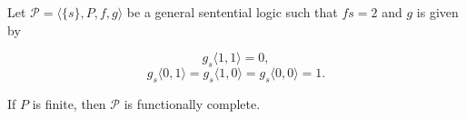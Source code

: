 Let $\mathcal{P} = \langle \{s\}, P, f, g \rangle$ be a general sentential logic such that $fs = 2$ and $g$ is given by

$$g_s \langle 1, 1 \rangle = 0,$$
$$g_s \langle 0, 1 \rangle = g_s \langle 1, 0 \rangle = g_s \langle 0, 0 \rangle = 1.$$

If $P$ is finite, then $\mathcal{P}$ is functionally complete.
